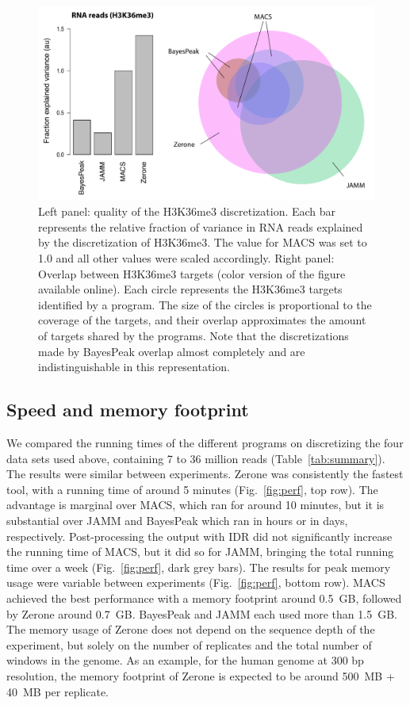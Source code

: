 \documentclass{bioinfo}
\begin{document}
\begin{figure}[!tpb]
\centerline{\includegraphics[scale=0.4]{histone_venn_color_names.pdf}}
\caption{
  Left panel: quality of the H3K36me3 discretization. Each bar
  represents the relative fraction of variance in RNA reads
  explained by the discretization of H3K36me3. The value for MACS was
  set to 1.0 and all other values were scaled accordingly. Right
  panel: Overlap between H3K36me3 targets (color version of the figure
  available online). Each circle represents the
  H3K36me3 targets identified by a program. The size of the circles
  is proportional to the coverage of the targets, and their overlap
  approximates the amount of targets shared by the programs. Note
  that the discretizations made by BayesPeak overlap almost completely and
  are indistinguishable in this representation.
}\label{fig:venn}
\end{figure}

\subsection{Speed and memory footprint}
\label{sub:perf}
We compared the running times of the different programs on
discretizing the four data sets used above, containing
7 to 36 million reads (Table~\ref{tab:summary}).
The results were similar between experiments. Zerone was
consistently the fastest tool, with a running time of around 5 minutes
(Fig.~\ref{fig:perf}, top row). The advantage is marginal over
MACS, which ran for around 10 minutes, but it is substantial over
JAMM and BayesPeak which ran in hours or in days, respectively.
Post-processing the output with IDR did not significantly increase
the running time of MACS, but it did so for JAMM, bringing the total
running time over a week (Fig.~\ref{fig:perf}, dark grey bars).
The results for peak memory usage were variable between experiments
(Fig.~\ref{fig:perf},
bottom row). MACS achieved the best performance with a memory
footprint around 0.5~GB, followed by Zerone around 0.7~GB.
BayesPeak and JAMM each used more than 1.5~GB. The memory usage
of Zerone does not depend on the sequence depth of the experiment,
but solely on the number of replicates and the total number of
windows in the genome. As an example, for the human genome at
300 bp resolution, the memory footprint of Zerone is expected to
be around 500~MB + 40~MB per replicate.
\end{document}
